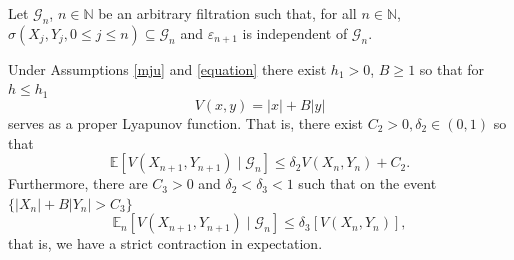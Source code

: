 \documentclass[10pt,a4paper]{amsart}
\def\mE{\mathbb{E}}
\begin{document}
\begin{lemma}\label{foster-lyapunov} Let $\mathcal{G}_{n}$, $n\in\mathbb{N}$ be an arbitrary
filtration such that, for all $n\in\mathbb{N}$, 
$\sigma(X_{j},Y_{j},0\leq j\leq n)\subseteq\mathcal{G}_{n}$ and $\varepsilon_{n+1}$ is independent of $\mathcal{G}_{n}$.

    Under Assumptions \ref{mju} and \ref{equation} there exist $h_1>0$, $B\geq 1$ so that for $h\leq h_1$ 
    \[
    V(x,y) = |x|+B|y|
    \]
    serves as a proper Lyapunov function. That is, there exist $C_2>0, \delta_2\in(0,1)$ so that
    \begin{equation}\label{nemo}
    \mE[V(X_{n+1},Y_{n+1})\mid\mathcal{G}_{n}]\leq \delta_2 V(X_{n},Y_{n})+C_2.
    \end{equation}
        Furthermore, there are $C_{3}>0$ and $\delta_2<\delta_3<1$ such that on the event
$\{|X_n|+B|Y_n|>C_3\}$
\begin{equation}
    \label{eq:lyap_contraction}
    \mE_n[V(X_{n+1},Y_{n+1})\mid\mathcal{G}_{n}]\leq \delta_3 [V(X_{n},Y_{n})],
\end{equation}
that is, we have a strict contraction in expectation.
\end{lemma}
\end{document}
